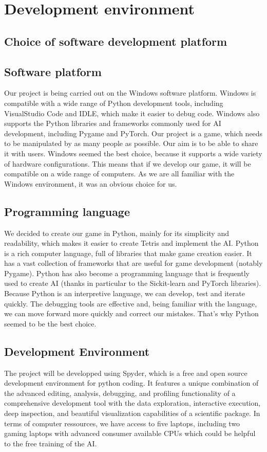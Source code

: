 \documentclass[conference]{IEEEtran}
\begin{document}
\section{Development environment}
\subsection{Choice of software development platform}

\subsection*{Software platform}

Our project is being carried out on the Windows software platform. Windows is compatible with a wide range of Python development tools, including VisualStudio Code and IDLE, which make it easier to debug code. Windows also supports the Python libraries and frameworks commonly used for AI development, including Pygame\cite{b4} and PyTorch\cite{b5}. Our project is a game, which needs to be manipulated by as many people as possible. Our aim is to be able to share it with users. Windows seemed the best choice, because it supports a wide variety of hardware configurations. This means that if we develop our game, it will be compatible on a wide range of computers. As we are all familiar with the Windows environment, it was an obvious choice for us.




\subsection*{Programming language}

We decided to create our game in Python, mainly for its simplicity and readability, which makes it easier to create Tetris and implement the AI. Python is a rich computer language, full of libraries that make game creation easier. It has a vast collection of frameworks that are useful for game development (notably Pygame\cite{b4}). Python has also become a programming language that is frequently used to create AI (thanks in particular to the Sickit-learn and PyTorch libraries\cite{b5}). Because Python is an interpretive language, we can develop, test and iterate quickly. The debugging tools are effective and, being familiar with the language, we can move forward more quickly and correct our mistakes. 
That's why Python seemed to be the best choice. 

\subsection*{Development Environment}
The project will be developped using Spyder, which is a free and open source development environment for python coding.  It features a unique combination of the advanced editing, analysis, debugging, and profiling functionality of a comprehensive development tool with the data exploration, interactive execution, deep inspection, and beautiful visualization capabilities of a scientific package. In terms of computer ressources, we have  access to five laptops, including two gaming laptops with advanced consumer available CPUs which could be helpful to the free training of the AI.
\end{document}
